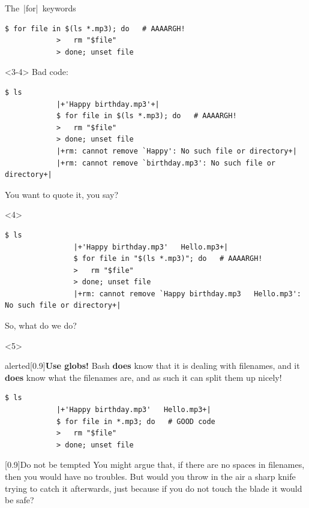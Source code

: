 \begin{frame}[fragile]{The \,\bash|for|\, keywords}
\begin{onlyenv}
\begin{lstlisting}[style=MyBash, xrightmargin=4mm]
            $ for file in $(ls *.mp3); do   # AAAARGH!
            >   rm "$file"
            > done; unset file
        \end{lstlisting}
    \end{onlyenv}
    \begin{onlyenv}<3-4>
        \vspace{-1mm}
        Bad code:
        \medskip
        \begin{lstlisting}[style=MyBash, xrightmargin=4mm]
            $ ls
            |+'Happy birthday.mp3'+|
            $ for file in $(ls *.mp3); do   # AAAARGH!
            >   rm "$file"
            > done; unset file
            |+rm: cannot remove `Happy': No such file or directory+|
            |+rm: cannot remove `birthday.mp3': No such file or directory+|
        \end{lstlisting}
        \medskip
        You want to quote it, you say?
        \medskip
        \begin{onlyenv}<4>
            \begin{lstlisting}[style=MyBash, xrightmargin=4mm]
                $ ls
                |+'Happy birthday.mp3'   Hello.mp3+|
                $ for file in "$(ls *.mp3)"; do   # AAAARGH!
                >   rm "$file"
                > done; unset file
                |+rm: cannot remove `Happy birthday.mp3   Hello.mp3': No such file or directory+|
            \end{lstlisting}
            \medskip
            So, what do we do?
        \end{onlyenv}
    \end{onlyenv}
    \begin{onlyenv}<5>
        \vspace{-1mm}
        \begin{varblock}{alerted}[0.9\textwidth]{\textbf{Use globs!}}
            Bash \textbf{does} know that it is dealing with filenames, and it \textbf{does} know what the filenames are, and as such it can split them up nicely!
        \end{varblock}
        \medskip
        \begin{lstlisting}[style=MyBash, xrightmargin=4mm]
            $ ls
            |+'Happy birthday.mp3'   Hello.mp3+|
            $ for file in *.mp3; do   # GOOD code
            >   rm "$file"
            > done; unset file
        \end{lstlisting}
        \medskip
        \begin{varblock}{}[0.9\textwidth]{Do not be tempted}
            You might argue that, if there are no spaces in filenames, then you would have no troubles.
            But would you throw in the air a sharp knife trying to catch it afterwards, just because if you do not touch the blade it would be safe?
        \end{varblock}
    \end{onlyenv}
\end{frame}








